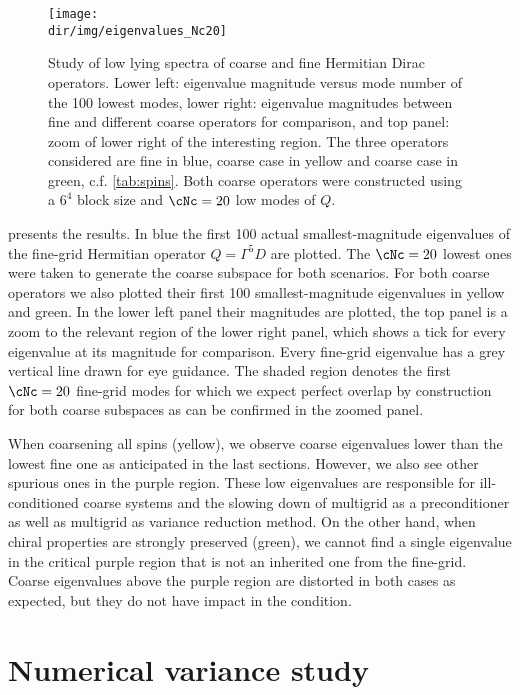 \begin{figure}
\centering
\texttt{[image: \\dir/img/eigenvalues\_Nc20]}
\caption{
Study of low lying spectra of coarse and fine Hermitian Dirac operators.
Lower left: eigenvalue magnitude versus mode number of the \num{100} lowest modes, lower right: eigenvalue magnitudes between fine and different coarse operators for comparison, and top panel: zoom of lower right of the interesting region.
The three operators considered are fine in blue, coarse case  in yellow and coarse case  in green, c.f. \cref{tab:spins}.
Both coarse operators were constructed using a $6^{4}$ block size and $\cNc=20$ low modes of $Q$.
\takenfull
}
\label{fig:chirality:spectrum}
\end{figure}

 presents the results.
In blue the first \num{100} actual smallest-magnitude eigenvalues of the fine-grid Hermitian operator $Q = \Gamma^5 D$ are plotted.
The $\cNc=20$ lowest ones were taken to generate the coarse subspace for both scenarios.
For both coarse operators we also plotted their first \num{100} smallest-magnitude eigenvalues in yellow and green.
In the lower left panel their magnitudes are plotted, the top panel is a zoom to the relevant region of the lower right panel, which shows a tick for every eigenvalue at its magnitude for comparison.
Every fine-grid eigenvalue has a grey vertical line drawn for eye guidance.
The shaded region denotes the first $\cNc=20$ fine-grid modes for which we expect perfect overlap by construction for both coarse subspaces as can be confirmed in the zoomed panel.

When coarsening all spins (yellow), we observe coarse eigenvalues lower than the lowest fine one as anticipated in the last sections.
However, we also see other spurious ones in the purple region.
These low eigenvalues are responsible for ill-conditioned coarse systems and the slowing down of multigrid as a preconditioner as well as multigrid as variance reduction method.
On the other hand, when chiral properties are strongly preserved (green), we cannot find a single eigenvalue in the critical purple region that is not an inherited one from the fine-grid.
Coarse eigenvalues above the purple region are distorted in both cases as expected, but they do not have impact in the condition.

\section{Numerical variance study}
\label{sec:chirality:variance}

